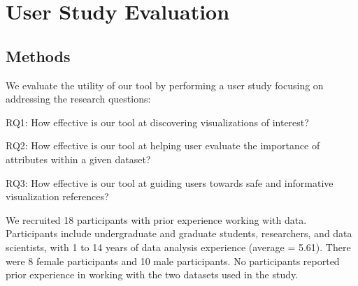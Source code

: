\section{User Study Evaluation\label{sec:userstudy}}
\subsection{Methods}
We evaluate the utility of our tool by performing a user study focusing on addressing the research questions:
\begin{denselist}
	\item RQ1: How effective is our tool at discovering visualizations of interest?
	\item RQ2: How effective is our tool at helping user evaluate the importance of attributes within a given dataset?
	\item RQ3: How effective is our tool at guiding users towards safe and informative visualization references? 
\end{denselist}

We recruited 18 participants with prior experience working with data. Participants include undergraduate and graduate students, researchers, and data scientists, with 1 to 14 years of data analysis experience (average = 5.61).  %
There were 8 female participants and 10 male participants. No participants reported prior experience in working with the two datasets used in the study.

